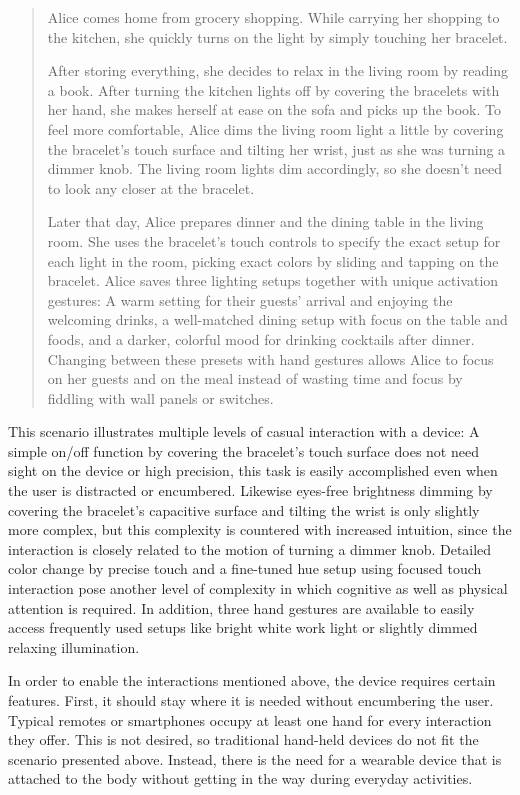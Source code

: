 \begin{quotation}
	Alice comes home from grocery shopping. While carrying her shopping to the kitchen, she quickly turns on the light by simply touching her bracelet.
	
	After storing everything, she decides to relax in the living room by reading a book. After turning the kitchen lights off by covering the bracelets with her hand, she makes herself at ease on the sofa and picks up the book. To feel more comfortable, Alice dims the living room light a little by covering the bracelet's touch surface and tilting her wrist, just as she was turning a dimmer knob. The living room lights dim accordingly, so she doesn't need to look any closer at the bracelet.
	
	Later that day, Alice prepares dinner and the dining table in the living room. She uses the bracelet's touch controls to specify the exact setup for each light in the room, picking exact colors by sliding and tapping on the bracelet. Alice saves three lighting setups together with unique activation gestures: A warm setting for their guests' arrival and enjoying the welcoming drinks, a well-matched dining setup with focus on the table and foods, and a darker, colorful mood for drinking cocktails after dinner. Changing between these presets with hand gestures allows Alice to focus on her guests and on the meal instead of wasting time and focus by fiddling with wall panels or switches.
	\end{quotation}
	
This scenario illustrates multiple levels of casual interaction with a device: A simple on/off function by covering the bracelet's touch surface does not need sight on the device or high precision, this task is easily accomplished even when the user is distracted or encumbered. Likewise eyes-free brightness dimming by covering the bracelet's capacitive surface and tilting the wrist is only slightly more complex, but this complexity is countered with increased intuition, since the interaction is closely related to the motion of turning a dimmer knob. Detailed color change by precise touch and a fine-tuned hue setup using focused touch interaction pose another level of complexity in which cognitive as well as physical attention is required. In addition, three hand gestures are available to easily access frequently used setups like bright white work light or slightly dimmed relaxing illumination.

In order to enable the interactions mentioned above, the device requires certain features. First, it should stay where it is needed without encumbering the user. Typical remotes or smartphones occupy at least one hand for every interaction they offer. This is not desired, so traditional hand-held devices do not fit the scenario presented above. Instead, there is the need for a wearable device that is attached to the body without getting in the way during everyday activities.

